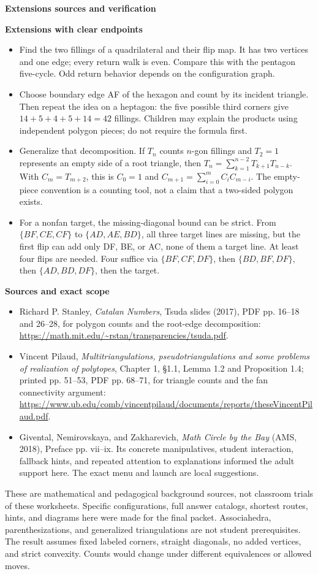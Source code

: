 \documentclass[11pt,letterpaper]{article}
\newcommand{\pagehead}[1]{{\Large\bfseries #1}\par\vspace{3pt}}
\begin{document}
\newpage
\pagehead{Extensions sources and verification}
\textbf{Extensions with clear endpoints}
\begin{itemize}
\item Find the two fillings of a quadrilateral and their flip map. It has two vertices and one edge; every return walk is even. Compare this with the pentagon five-cycle. Odd return behavior depends on the configuration graph.
\item Choose boundary edge AF of the hexagon and count by its incident triangle. Then repeat the idea on a heptagon: the five possible third corners give $14+5+4+5+14=42$ fillings. Children may explain the products using independent polygon pieces; do not require the formula first.
\item Generalize that decomposition. If $T_n$ counts $n$-gon fillings and $T_2=1$ represents an empty side of a root triangle, then $T_n=\sum_{k=1}^{n-2}T_{k+1}T_{n-k}$. With $C_m=T_{m+2}$, this is $C_0=1$ and $C_{m+1}=\sum_{i=0}^{m}C_iC_{m-i}$. The empty-piece convention is a counting tool, not a claim that a two-sided polygon exists.
\item For a nonfan target, the missing-diagonal bound can be strict. From $\{BF,CE,CF\}$ to $\{AD,AE,BD\}$, all three target lines are missing, but the first flip can add only DF, BE, or AC, none of them a target line. At least four flips are needed. Four suffice via $\{BF,CF,DF\}$, then $\{BD,BF,DF\}$, then $\{AD,BD,DF\}$, then the target.
\end{itemize}
\textbf{Sources and exact scope}
\begin{itemize}
\item Richard P. Stanley, \emph{Catalan Numbers}, Tsuda slides (2017), PDF pp. 16--18 and 26--28, for polygon counts and the root-edge decomposition: \url{https://math.mit.edu/~rstan/transparencies/tsuda.pdf}.
\item Vincent Pilaud, \emph{Multitriangulations, pseudotriangulations and some problems of realization of polytopes}, Chapter 1, \S1.1, Lemma 1.2 and Proposition 1.4; printed pp. 51--53, PDF pp. 68--71, for triangle counts and the fan connectivity argument: \url{https://www.ub.edu/comb/vincentpilaud/documents/reports/theseVincentPilaud.pdf}.
\item Givental, Nemirovskaya, and Zakharevich, \emph{Math Circle by the Bay} (AMS, 2018), Preface pp. vii--ix. Its concrete manipulatives, student interaction, fallback hints, and repeated attention to explanations informed the adult support here. The exact menu and launch are local suggestions.
\end{itemize}
These are mathematical and pedagogical background sources, not classroom trials of these worksheets. Specific configurations, full answer catalogs, shortest routes, hints, and diagrams here were made for the final packet. Associahedra, parenthesizations, and generalized triangulations are not student prerequisites. The result assumes fixed labeled corners, straight diagonals, no added vertices, and strict convexity. Counts would change under different equivalences or allowed moves.
\end{document}
